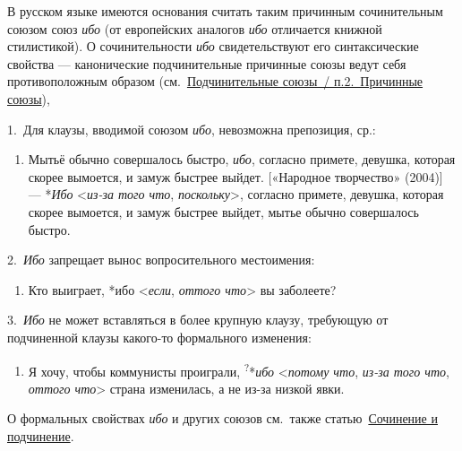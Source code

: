 В русском языке имеются основания считать таким причинным сочинительным
союзом союз \textit{ибо} (от европейских аналогов \textit{ибо} отличается
книжной стилистикой). О сочинительности \textit{ибо} свидетельствуют его
синтаксические свойства --- канонические подчинительные причинные союзы
ведут себя противоположным образом (см.~\underline{Подчинительные
  союзы~/ п.2.~Причинные союзы}),

1.~Для клаузы, вводимой союзом \textit{ибо}, невозможна препозиция, ср.:

\begin{enumerate}
  \def\labelenumi{(\arabic{enumi})}
  \setcounter{enumi}{176}
  \item
        Мытьё обычно совершалось быстро, \textit{ибо}, согласно примете,
        девушка, которая скорее вымоется, и замуж быстрее выйдет. {[}«Народное
        творчество» (2004){]} --- *\textit{Ибо} \textless{}\textit{из-за того что},
        \textit{поскольку}\textgreater, согласно примете, девушка, которая
        скорее вымоется, и замуж быстрее выйдет, мытье обычно совершалось
        быстро.
\end{enumerate}

2.~\textit{Ибо} запрещает вынос вопросительного местоимения:

\begin{enumerate}
  \def\labelenumi{(\arabic{enumi})}
  \setcounter{enumi}{177}
  \item
        Кто выиграет, *ибо \textless{}\textit{если}, \textit{оттого
          что}\textgreater{} вы заболеете?
\end{enumerate}

3.~\textit{Ибо} не может вставляться в более крупную клаузу, требующую от
подчиненной клаузы какого-то формального изменения:

\begin{enumerate}
  \def\labelenumi{(\arabic{enumi})}
  \setcounter{enumi}{178}
  \item
        Я хочу, чтобы коммунисты проиграли, \textsuperscript{?}*\textit{ибо}
        \textless{}\textit{потому что}, \textit{из-за того что}, \textit{оттого
          что}\textgreater{} страна изменилась, а не из-за низкой явки.
\end{enumerate}

О формальных свойствах \textit{ибо} и других союзов см.~также
статью~\underline{Сочинение и подчинение}.

